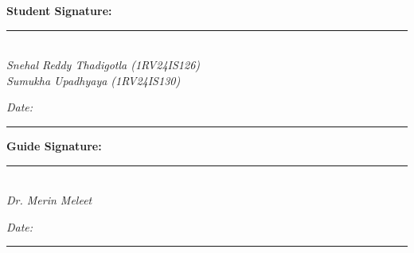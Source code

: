 \documentclass[12pt,a4paper]{article}
\begin{document}
\vspace{6pt}
\noindent\begin{minipage}[t]{0.5\linewidth}
\textbf{Student Signature:}\\[1.1cm]
\rule{0.93\linewidth}{0.5pt}\\[-2pt]
{\itshape\small\color{gtext}Snehal Reddy Thadigotla (1RV24IS126)\\ Sumukha Upadhyaya (1RV24IS130)}\\
{\itshape\small\color{gtext}Date: \rule[-2pt]{3.4cm}{0.4pt}}
\end{minipage}%
\vrule\hspace{8pt}%
\begin{minipage}[t]{0.46\linewidth}
\textbf{Guide Signature:}\\[1.1cm]
\rule{\linewidth}{0.5pt}\\[-2pt]
{\itshape\small\color{gtext}Dr. Merin Meleet}\\
{\itshape\small\color{gtext}Date: \rule[-2pt]{3.4cm}{0.4pt}}
\end{minipage}
\end{document}
